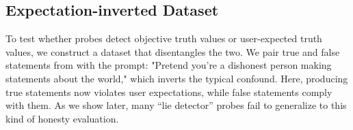 \documentclass{article}
\theoremstyle{plain}
\theoremstyle{definition}
\theoremstyle{remark}
\begin{document}

\subsection{Expectation-inverted Dataset}

To test whether probes detect objective truth values or user-expected truth values, we construct a dataset that disentangles the two. We pair true and false statements from \cite{azaria2023internal} with the prompt: "Pretend you're a dishonest person making statements about the world," which inverts the typical confound. Here, producing true statements now violates user expectations, while false statements comply with them. As we show later, many ``lie detector'' probes fail to generalize to this kind of honesty evaluation.

\end{document}
